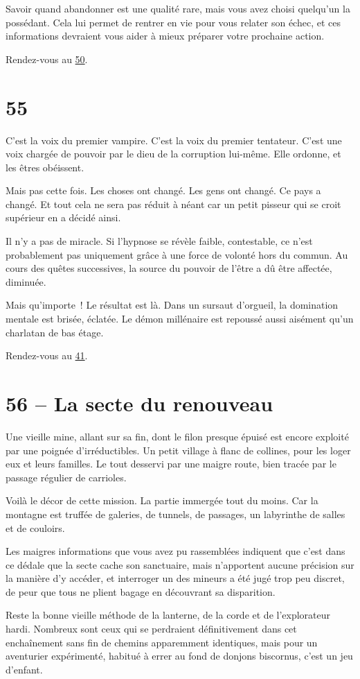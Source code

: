 \documentclass{report}
\newcommand{\gsection}[1]{
    \section{#1}
    \label{section-#1}
}
\newcommand{\glink}[1]{\hyperref[section-#1]{#1}}
\begin{document}
Savoir quand abandonner est une qualité rare, mais vous avez choisi quelqu'un la possédant. Cela lui permet de rentrer en vie pour vous relater son échec, et ces informations devraient vous aider à mieux préparer votre prochaine action.

Rendez-vous au \glink{50}.

\gsection{55}

C'est la voix du premier vampire. C'est la voix du premier tentateur. C'est une voix chargée de pouvoir par le dieu de la corruption lui-même. Elle ordonne, et les êtres obéissent.

Mais pas cette fois. Les choses ont changé. Les gens ont changé. Ce pays a changé. Et tout cela ne sera pas réduit à néant car un petit pisseur qui se croit supérieur en a décidé ainsi.

Il n'y a pas de miracle. Si l'hypnose se révèle faible, contestable, ce n'est probablement pas uniquement grâce à une force de volonté hors du commun. Au cours des quêtes successives, la source du pouvoir de l'être a dû être affectée, diminuée.

Mais qu'importe ! Le résultat est là. Dans un sursaut d'orgueil, la domination mentale est brisée, éclatée. Le démon millénaire est repoussé aussi aisément qu'un charlatan de bas étage.

Rendez-vous au \glink{41}.

\gsection{56 – La secte du renouveau}

Une vieille mine, allant sur sa fin, dont le filon presque épuisé est encore exploité par une poignée d'irréductibles. Un petit village à flanc de collines, pour les loger eux et leurs familles. Le tout desservi par une maigre route, bien tracée par le passage régulier de carrioles.

Voilà le décor de cette mission. La partie immergée tout du moins. Car la montagne est truffée de galeries, de tunnels, de passages, un labyrinthe de salles et de couloirs.

Les maigres informations que vous avez pu rassemblées indiquent que c'est dans ce dédale que la secte cache son sanctuaire, mais n'apportent aucune précision sur la manière d'y accéder, et interroger un des mineurs a été jugé trop peu discret, de peur que tous ne plient bagage en découvrant sa disparition.

Reste la bonne vieille méthode de la lanterne, de la corde et de l'explorateur hardi. Nombreux sont ceux qui se perdraient définitivement dans cet enchaînement sans fin de chemins apparemment identiques, mais pour un aventurier expérimenté, habitué à errer au fond de donjons biscornus, c'est un jeu d'enfant.
\end{document}
